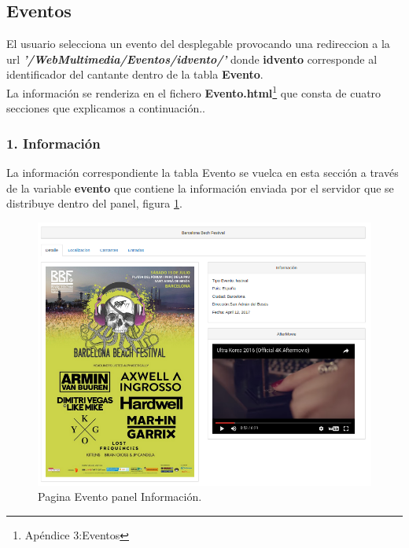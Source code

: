 \subsection{Eventos}
El usuario selecciona un evento del desplegable provocando una redireccion a la url \textit{\textbf{'/WebMultimedia/Eventos/idvento/'}} donde \textbf{idvento} corresponde al identificador del cantante dentro de la tabla \textbf{Evento}.
\\La información se renderiza en el fichero \textbf{Evento.html}\footnote{Apéndice 3:Eventos} que consta de cuatro secciones que explicamos a continuación..
\subsubsection*{1. Información}
La información correspondiente la tabla Evento se vuelca en esta sección a través de la variable \textbf{evento} que contiene la información enviada por el servidor que se distribuye dentro del panel, figura \ref{fig:Informacion_Evento}.
\begin{figure}[!h]
\begin{center}
   \includegraphics[width=0.6\linewidth]{Figures/Init_Evento}
	\decoRule
	\caption[Evento panel Información]{Pagina Evento panel Información.}
\label{fig:Informacion_Evento}
\end{center}
\end{figure}
